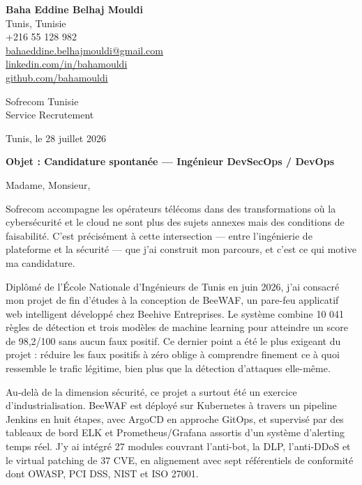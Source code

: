 \documentclass[a4paper,11pt]{article}
\begin{document}
\begin{flushright}
{\bfseries Baha Eddine Belhaj Mouldi}\\
Tunis, Tunisie\\
+216 55 128 982\\
\href{mailto:bahaeddine.belhajmouldi@gmail.com}{bahaeddine.belhajmouldi@gmail.com}\\
\href{https://linkedin.com/in/bahamouldi}{linkedin.com/in/bahamouldi}\\
\href{https://github.com/bahamouldi}{github.com/bahamouldi}
\end{flushright}

\vspace{0.8cm}

\begin{flushleft}
Sofrecom Tunisie\\
Service Recrutement

\vspace{0.8cm}

Tunis, le 28 juillet 2026

\vspace{0.6cm}

{\bfseries Objet : Candidature spontanée --- Ingénieur DevSecOps / DevOps}
\end{flushleft}

\vspace{0.6cm}

Madame, Monsieur,

Sofrecom accompagne les opérateurs télécoms dans des transformations où la cybersécurité et le cloud ne sont plus des sujets annexes mais des conditions de faisabilité. C'est précisément à cette intersection --- entre l'ingénierie de plateforme et la sécurité --- que j'ai construit mon parcours, et c'est ce qui motive ma candidature.

Diplômé de l'École Nationale d'Ingénieurs de Tunis en juin 2026, j'ai consacré mon projet de fin d'études à la conception de BeeWAF, un pare-feu applicatif web intelligent développé chez Beehive Entreprises. Le système combine 10 041 règles de détection et trois modèles de machine learning pour atteindre un score de 98,2/100 sans aucun faux positif. Ce dernier point a été le plus exigeant du projet : réduire les faux positifs à zéro oblige à comprendre finement ce à quoi ressemble le trafic légitime, bien plus que la détection d'attaques elle-même.

Au-delà de la dimension sécurité, ce projet a surtout été un exercice d'industrialisation. BeeWAF est déployé sur Kubernetes à travers un pipeline Jenkins en huit étapes, avec ArgoCD en approche GitOps, et supervisé par des tableaux de bord ELK et Prometheus/Grafana assortis d'un système d'alerting temps réel. J'y ai intégré 27 modules couvrant l'anti-bot, la DLP, l'anti-DDoS et le virtual patching de 37 CVE, en alignement avec sept référentiels de conformité dont OWASP, PCI DSS, NIST et ISO 27001.
\end{document}
